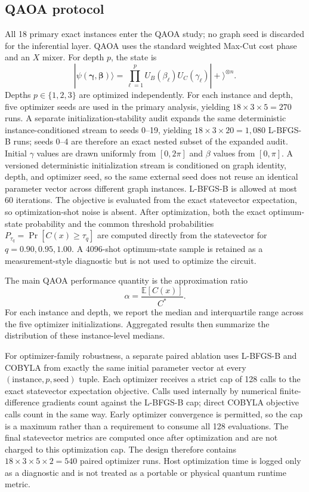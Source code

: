 \documentclass[5p,times]{elsarticle}
\begin{document}
\subsection{QAOA protocol}
All 18 primary exact instances enter the QAOA study; no graph seed is discarded for the inferential layer. QAOA uses the standard weighted Max-Cut cost phase and an $X$ mixer. For depth $p$, the state is
\begin{equation}
|\psi(\boldsymbol\gamma,\boldsymbol\beta)\rangle
=\prod_{\ell=1}^{p}
U_B(\beta_\ell)U_C(\gamma_\ell)|+\rangle^{\otimes n}.
\end{equation}
Depths $p\in\{1,2,3\}$ are optimized independently. For each instance and depth, five optimizer seeds are used in the primary analysis, yielding $18\times3\times5=270$ runs. A separate initialization-stability audit expands the same deterministic instance-conditioned stream to seeds 0--19, yielding $18\times3\times20=1{,}080$ L-BFGS-B runs; seeds 0--4 are therefore an exact nested subset of the expanded audit. Initial $\gamma$ values are drawn uniformly from $[0,2\pi]$ and $\beta$ values from $[0,\pi]$. A versioned deterministic initialization stream is conditioned on graph identity, depth, and optimizer seed, so the same external seed does not reuse an identical parameter vector across different graph instances. L-BFGS-B is allowed at most 60 iterations. The objective is evaluated from the exact statevector expectation, so optimization-shot noise is absent. After optimization, both the exact optimum-state probability and the common threshold probabilities $P_{\tau_q}=\Pr[C(x)\geq\tau_q]$ are computed directly from the statevector for $q=0.90,0.95,1.00$. A 4096-shot optimum-state sample is retained as a measurement-style diagnostic but is not used to optimize the circuit.

The main QAOA performance quantity is the approximation ratio
\begin{equation}
\alpha=\frac{\mathbb{E}[C(x)]}{C^*}.
\end{equation}
For each instance and depth, we report the median and interquartile range across the five optimizer initializations. Aggregated results then summarize the distribution of these instance-level medians.

For optimizer-family robustness, a separate paired ablation uses L-BFGS-B and COBYLA from exactly the same initial parameter vector at every $(\text{instance},p,\text{seed})$ tuple. Each optimizer receives a strict cap of 128 calls to the exact statevector expectation objective. Calls used internally by numerical finite-difference gradients count against the L-BFGS-B cap; direct COBYLA objective calls count in the same way. Early optimizer convergence is permitted, so the cap is a maximum rather than a requirement to consume all 128 evaluations. The final statevector metrics are computed once after optimization and are not charged to this optimization cap. The design therefore contains $18\times3\times5\times2=540$ paired optimizer runs. Host optimization time is logged only as a diagnostic and is not treated as a portable or physical quantum runtime metric.
\end{document}
